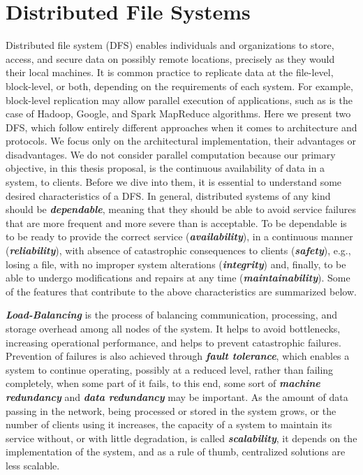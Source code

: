 \documentclass[runningheads]{llncs}
\begin{document}
\newpage\section{Distributed File Systems}\label{sec:distributed-file-systems}
Distributed file system (DFS) enables individuals and organizations to store, access, and secure data on possibly remote locations, precisely as they would their local machines. It is common practice to replicate data at the file-level, block-level, or both, depending on the requirements of each system. For example, block-level replication may allow parallel execution of applications, such as is the case of Hadoop, Google, and Spark MapReduce algorithms. Here we present two DFS, which follow entirely different approaches when it comes to architecture and protocols. We focus only on the architectural implementation, their advantages or disadvantages. We do not consider parallel computation because our primary objective, in this thesis proposal, is the continuous availability of data in a system, to clients. Before we dive into them, it is essential to understand some desired characteristics of a DFS. In general, distributed systems of any kind should be \textbf{\textit{dependable}}, meaning that they should be able to avoid service failures that are more frequent and more severe than is acceptable. To be dependable is to be ready to provide the correct service (\textbf{\textit{availability}}), in a continuous manner (\textbf{\textit{reliability}}), with absence of catastrophic consequences to clients (\textbf{\textit{safety}}), e.g., losing a file, with no improper system alterations (\textbf{\textit{integrity}}) and, finally, to be able to undergo modifications and repairs at any time (\textbf{\textit{maintainability}}). Some of the features that contribute to the above characteristics are summarized below.

\textbf{\textit{Load-Balancing}} is the process of balancing communication, processing, and storage overhead among all nodes of the system. It helps to avoid bottlenecks, increasing operational performance, and helps to prevent catastrophic failures. Prevention of failures is also achieved through \textbf{\textit{fault tolerance}}, which enables a system to continue operating, possibly at a reduced level,  rather  than failing completely, when some part of it fails, to this end, some sort of \textbf{\textit{machine redundancy}} and \textbf{\textit{data redundancy}} may be important. As the amount of data passing in the network, being processed or stored in the system grows, or the number of clients using it increases, the capacity of a system to maintain its service without, or with little degradation, is called \textbf{\textit{scalability}}, it depends on the implementation of the system, and as a rule of thumb, centralized solutions are less scalable.
\end{document}
